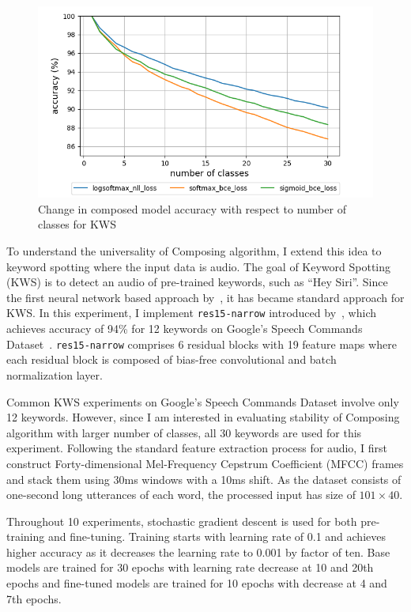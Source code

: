\documentclass{article}
\begin{document}
\begin{figure}[t]
    \centering
    \includegraphics[scale=0.5,trim={0mm 0mm 0mm 0mm},clip]{kws.png}
    \caption{Change in composed model accuracy with respect to number of classes for KWS}
    \label{figure:composed_kws}
\end{figure}


To understand the universality of Composing algorithm, I extend this idea to keyword spotting where the input data is audio. The goal of Keyword Spotting (KWS) is to detect an audio of pre-trained keywords, such as “Hey Siri”. Since the first neural network based approach by~\cite{chen2014small}, it has became standard approach for KWS. In this experiment, I implement \texttt{res15-narrow} introduced by~\cite{tang2018deep}, which achieves accuracy of 94\% for 12 keywords on Google’s Speech Commands Dataset~\cite{speechcommandsdataset}. \texttt{res15-narrow} comprises 6 residual blocks with 19 feature maps where each residual block is composed of bias-free convolutional and batch normalization layer.

Common KWS experiments on Google’s Speech Commands Dataset involve only 12 keywords. However, since I am interested in evaluating stability of Composing algorithm with larger number of classes, all 30 keywords are used for this experiment. Following the standard feature extraction process for audio, I first construct Forty-dimensional Mel-Frequency Cepstrum Coefficient (MFCC) frames and stack them using 30ms windows with a 10ms shift. As the dataset consists of one-second long utterances of each word, the processed input has size of $101\times40$.

Throughout 10 experiments, stochastic gradient descent is used for both pre-training and fine-tuning. Training starts with learning rate of 0.1 and achieves higher accuracy as it decreases the learning rate to 0.001 by factor of ten. Base models are trained for 30 epochs with learning rate decrease at 10 and 20th epochs and fine-tuned models are trained for 10 epochs with decrease at 4 and 7th epochs.
\end{document}
